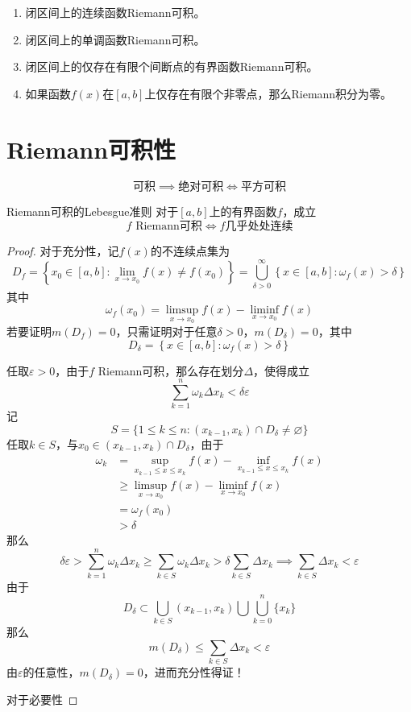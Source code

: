 \documentclass[lang = cn, scheme = chinese, thmcnt = section]{elegantbook}
\newcommand{\sub}{\subset}             %
\begin{document}
\begin{corollary}
	\begin{enumerate}
		\item 闭区间上的连续函数Riemann可积。
		\item 闭区间上的单调函数Riemann可积。
		\item 闭区间上的仅存在有限个间断点的有界函数Riemann可积。
		\item 如果函数$f(x)$在$[a,b]$上仅存在有限个非零点，那么Riemann积分为零。
	\end{enumerate}
\end{corollary}

\section{Riemann可积性}

\begin{theorem}
	$$
	\text{可积}\implies
	\text{绝对可积}\iff
	\text{平方可积}
	$$
\end{theorem}

\begin{theorem}{Riemann可积的Lebesgue准则}
	对于$[a,b]$上的有界函数$f$，成立
	$$
	f\text{ Riemann可积}
	\iff
	f\text{几乎处处连续}
	$$
\end{theorem}

\begin{proof}
	对于充分性，记$f(x)$的不连续点集为
	$$
	D_f=\left\{ x_0\in [a,b]:\lim_{x\to x_0}f(x)\ne f(x_0) \right\}
	=\bigcup_{\delta>0}^{\infty}\left\{ x\in [a,b]:\omega_f(x)>\delta \right\}
	$$
	其中
	$$
	\omega_f(x_0)=\limsup_{x\to x_0}f(x)-\liminf_{x\to x_0}f(x)
	$$
	若要证明$m(D_f)=0$，只需证明对于任意$\delta>0$，$m(D_\delta)=0$，其中
	$$
	D_\delta=\left\{ x\in [a,b]:\omega_f(x)>\delta \right\}
	$$
	
	任取$\varepsilon>0$，由于$f$ Riemann可积，那么存在划分$\Delta$，使得成立
	$$
	\sum_{k=1}^{n}\omega_k\Delta x_k <\delta\varepsilon
	$$
	记
	$$
	S=\{ 1\le k \le n:(x_{k-1},x_k)\cap D_\delta\ne\varnothing \}
	$$
	任取$k\in S$，与$x_0\in (x_{k-1},x_k)\cap D_\delta$，由于
	\begin{align*}
		\omega_k
		& = \sup_{x_{k-1}\le x \le x_k}f(x)-\inf_{x_{k-1}\le x \le x_k}f(x)\\
		& \ge \limsup_{x\to x_0}f(x)-\liminf_{x\to x_0}f(x)\\
		& = \omega_f(x_0)\\
		& >\delta
	\end{align*}
	那么
	$$
	\delta\varepsilon
	>\sum_{k=1}^{n}\omega_k\Delta x_k
	\ge \sum_{k\in S}\omega_k\Delta x_k
	> \delta\sum_{k\in S}\Delta x_k
	\implies
	\sum_{k\in S}\Delta x_k<\varepsilon
	$$
	由于
	$$
	D_\delta\sub \bigcup_{k\in S}(x_{k-1},x_k)\bigcup \bigcup_{k=0}^{n}\{x_k\}
	$$
	那么
	$$
	m(D_\delta)
	\le \sum_{k\in S}\Delta x_k<\varepsilon
	$$
	由$\varepsilon$的任意性，$m(D_\delta)=0$，进而充分性得证！
	
	对于必要性
\end{proof}
\end{document}
